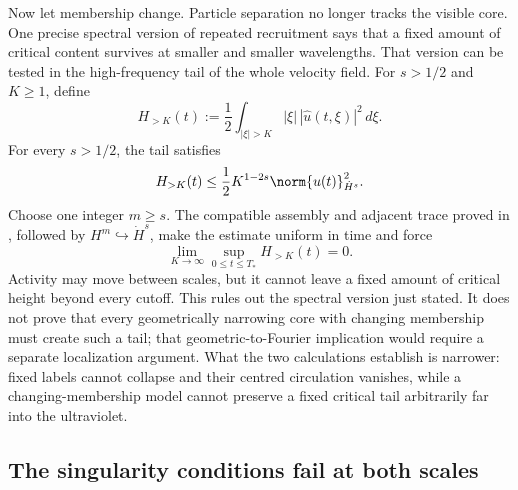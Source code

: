 Now let membership change.  Particle separation no longer tracks the visible
core.  One precise spectral version of repeated recruitment says that a fixed
amount of critical content survives at smaller and smaller wavelengths.  That
version can be tested in the high-frequency tail of the whole velocity field.
For \(s>1/2\) and \(K\geq1\), define
\[
  H_{>K}(t)
  :=\frac12\int_{|\xi|>K}
  |\xi|\,|\widehat u(t,\xi)|^2\,d\xi.
\]
For every \(s>1/2\), the tail satisfies
\begin{equation}\label{eq:BodyUltravioletCriticalTail}
  H_{>K}(t)
  \leq
  \frac12K^{1-2s}\norm{u(t)}_{\dot H^s}^2.
\end{equation}
Choose one integer \(m\geq s\).  The compatible assembly and adjacent trace
proved in ,
followed by \(H^m\hookrightarrow\dot H^s\), make the estimate uniform in time
and force
\begin{equation}\label{eq:BodyUniformUltravioletVanishing}
  \lim_{K\to\infty}
  \sup_{0\leq t\leq T_*}H_{>K}(t)=0.
\end{equation}
Activity may move between scales, but it cannot leave a fixed amount of critical
height beyond every cutoff.  This rules out the spectral version just stated.
It does not prove that every geometrically narrowing core with changing
membership must create such a tail; that geometric-to-Fourier implication would
require a separate localization argument.  What the two calculations establish
is narrower: fixed labels cannot collapse and their centred circulation
vanishes, while a changing-membership model cannot preserve a fixed critical
tail arbitrarily far into the ultraviolet.

\subsection{The singularity conditions fail at both scales}\label{sub:TheLocalSingularityPictureCloses}


